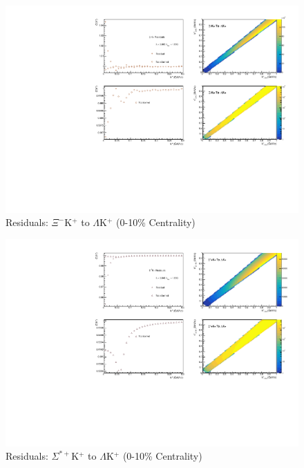 \documentclass[../AnalysisNoteJBuxton.tex]{subfiles}
\begin{document}
\begin{figure}[h]
  \centering
  \includegraphics[width=\textwidth]{9_AdditionalFigures/Figures/Residuals/LamKchP/Residuals_LamKchP_0010_XiKchP_MomResCrctn_NonFlatBgdCrctn_10Res_PrimMaxDecay4fm_UsingXiDataAndCoulombOnly.pdf}
  \caption[Residuals: $\Xi^{-}$K$^{+}$ to $\Lambda$K$^{+}$ (0-10\% Centrality)]{Residuals: $\Xi^{-}$K$^{+}$ to $\Lambda$K$^{+}$ (0-10\% Centrality)}
  \label{fig:Res_LamKchP_0010_XiCKchP}
\end{figure}


\begin{figure}[h]
  \centering
  \includegraphics[width=\textwidth]{9_AdditionalFigures/Figures/Residuals/LamKchP/Residuals_LamKchP_0010_SigStPKchP_MomResCrctn_NonFlatBgdCrctn_10Res_PrimMaxDecay4fm_UsingXiDataAndCoulombOnly.pdf}
  \caption[Residuals: $\Sigma^{*+}$K$^{+}$ to $\Lambda$K$^{+}$ (0-10\% Centrality)]{Residuals: $\Sigma^{*+}$K$^{+}$ to $\Lambda$K$^{+}$ (0-10\% Centrality)}
  \label{fig:Res_LamKchP_0010_SigStPKchP}
\end{figure}
\end{document}
